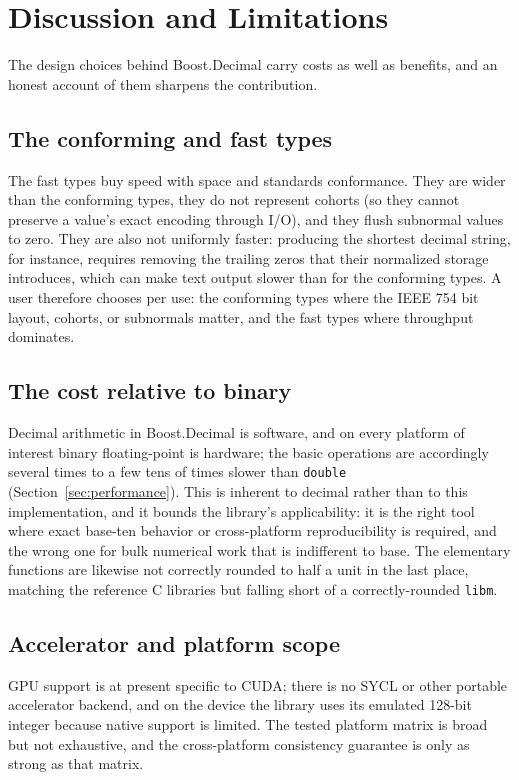 \documentclass[acmsmall]{acmart}
\begin{document}
\section{Discussion and Limitations}
\label{sec:discussion}

The design choices behind Boost.Decimal carry costs as well as benefits, and an honest
account of them sharpens the contribution.

\subsection{The conforming and fast types}
The fast types buy speed with space and standards conformance. They are wider than the
conforming types, they do not represent cohorts (so they cannot preserve a value's exact
encoding through I/O), and they flush subnormal values to zero. They are also not
uniformly faster: producing the shortest decimal string, for instance, requires removing
the trailing zeros that their normalized storage introduces, which can make text output
slower than for the conforming types. A user therefore chooses per use: the conforming
types where the IEEE 754 bit layout, cohorts, or subnormals matter, and the fast types
where throughput dominates.

\subsection{The cost relative to binary}
Decimal arithmetic in Boost.Decimal is software, and on every platform of interest binary
floating-point is hardware; the basic operations are accordingly several times to a few
tens of times slower than \texttt{double} (Section~\ref{sec:performance}). This is inherent
to decimal rather than to this implementation, and it bounds the library's applicability:
it is the right tool where exact base-ten behavior or cross-platform reproducibility is
required, and the wrong one for bulk numerical work that is indifferent to base. The
elementary functions are likewise not correctly rounded to half a unit in the last place,
matching the reference C libraries but falling short of a correctly-rounded \texttt{libm}.

\subsection{Accelerator and platform scope}
GPU support is at present specific to CUDA; there is no SYCL or other portable accelerator
backend, and on the device the library uses its emulated 128-bit integer because native
support is limited. The tested platform matrix is broad but not exhaustive, and the
cross-platform consistency guarantee is only as strong as that matrix.
\end{document}
